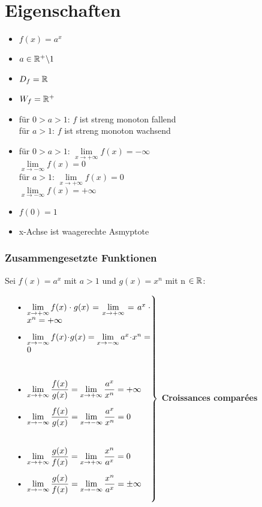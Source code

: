 \documentclass[main.tex]{subfiles}
\begin{document}
\section{Eigenschaften}

\begin{itemize}
	\item$f(x)=a^x$
	\item$a\in\mathbb{R}^+\backslash 1$
	\item$D_f=\mathbb{R}$
	\item$W_f=\mathbb{R}^+$
	\item für $0>a>1$: $f$ ist streng monoton fallend\\
	für $a>1$: $f$ ist streng monoton wachsend
	\item für $0>a>1$: $\lim\limits_{x\to +\infty}f(x)=-\infty$\\
				$\lim\limits_{x\to -\infty}f(x)=0$\\
	für $a>1$: $\lim\limits_{x\to +\infty}f(x)=0$\\
				$\lim\limits_{x\to -\infty}f(x)=+\infty$
	\item $f(0)=1$
	\item x-Achse ist waagerechte Asmyptote
\end{itemize}

\subsubsection{Zusammengesetzte Funktionen}

Sei $f(x)= a^x$ mit $a>1$ und $g(x)=x^n$ mit n $\in \mathbb{R}$:

$\left.\parbox{0.5\textwidth}{
	\begin{itemize}
		\item $\lim\limits_{x\to +\infty} f(x)\cdot g(x) = \lim\limits_{x\to +\infty} = a^x \cdot x^n= +\infty $
		\item $\lim\limits_{x\to -\infty} f(x)\cdot g(x) = \lim\limits_{x\to -\infty}a^x \cdot x^n= 0$ \\\\
		\item $\lim\limits_{x\to +\infty} \dfrac{f(x)}{g(x)} = \lim\limits_{x\to +\infty}\dfrac{a^x}{x^n} = +\infty $
		\item $\lim\limits_{x\to -\infty} \dfrac{f(x)}{g(x)} = \lim\limits_{x\to -\infty}\dfrac{a^x}{x^n} = 0$ \\\\
		\item $\lim\limits_{x\to +\infty} \dfrac{g(x)}{f(x)} = \lim\limits_{x\to +\infty}\dfrac{x^n}{a^x} =  0$
		\item $\lim\limits_{x\to -\infty} \dfrac{g(x)}{f(x)} = \lim\limits_{x\to -\infty}\dfrac{x^n}{a^x} = \pm\infty$
	\end{itemize}
} \right\}$ \quad \textbf{Croissances comparées}
\end{document}
